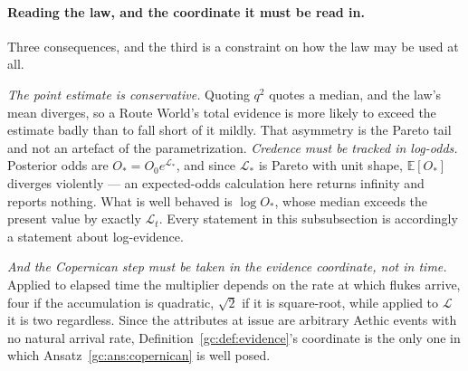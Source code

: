 \documentclass[11pt]{article}
\numberwithin{equation}{section}
\theoremstyle{plain}
\theoremstyle{definition}
\theoremstyle{remark}
\newcommand{\E}{\mathbb{E}}
\newcommand{\Lc}{\mathcal{L}}
\begin{document}
\paragraph{Reading the law, and the coordinate it must be read in.}\label{gc:rem:lindy}
Three consequences, and the third is a constraint on how the law may be
used at all.

\emph{The point estimate is conservative.} Quoting $q^{2}$ quotes a
median, and the law's mean diverges, so a Route World's total evidence
is more likely to exceed the estimate badly than to fall short of it
mildly. That asymmetry is the Pareto tail and not an artefact of the
parametrization. \emph{Credence must be tracked in log-odds.} Posterior odds are
$O_\ast=O_0e^{\Lc_\ast}$, and since $\Lc_\ast$ is Pareto with unit
shape, $\E[O_\ast]$ diverges violently --- an expected-odds calculation
here returns infinity and reports nothing. What is well behaved is
$\log O_\ast$, whose median exceeds the present value by exactly
$\Lc_t$. Every statement in this subsubsection is accordingly a
statement about log-evidence.

\emph{And the Copernican step must be taken in the evidence coordinate,
not in time.} Applied to elapsed time the multiplier depends on the rate
at which flukes arrive, four if the accumulation is quadratic,
$\sqrt2$ if it is square-root, while applied to $\Lc$ it is two
regardless. Since the attributes at issue are arbitrary Aethic events
with no natural arrival rate,
Definition~\ref{gc:def:evidence}'s coordinate is the only one in which
Ansatz~\ref{gc:ans:copernican} is well posed.
\end{document}
